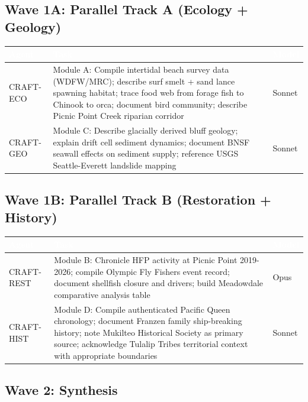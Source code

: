 \documentclass[11pt,letterpaper]{article}
\newcommand{\tableheader}[1]{\textbf{\sffamily\textcolor{white}{#1}}}
\begin{document}
\subsection{Wave 1A: Parallel Track A (Ecology + Geology)}

\begin{center}
\begin{tabularx}{\textwidth}{L{2cm}XL{2cm}}
\toprule
{}
\tableheader{Agent} & \tableheader{Task} & \tableheader{Model} \\
\midrule
CRAFT-ECO & Module A: Compile intertidal beach survey data (WDFW/MRC); describe surf smelt + sand lance spawning habitat; trace food web from forage fish to Chinook to orca; document bird community; describe Picnic Point Creek riparian corridor & Sonnet \\
CRAFT-GEO & Module C: Describe glacially derived bluff geology; explain drift cell sediment dynamics; document BNSF seawall effects on sediment supply; reference USGS Seattle-Everett landslide mapping & Sonnet \\
\bottomrule
\end{tabularx}
\end{center}

\subsection{Wave 1B: Parallel Track B (Restoration + History)}

\begin{center}
\begin{tabularx}{\textwidth}{L{2cm}XL{2cm}}
\toprule
{}
\tableheader{Agent} & \tableheader{Task} & \tableheader{Model} \\
\midrule
CRAFT-REST & Module B: Chronicle HFP activity at Picnic Point 2019-2026; compile Olympic Fly Fishers event record; document shellfish closure and drivers; build Meadowdale comparative analysis table & Opus \\
CRAFT-HIST & Module D: Compile authenticated Pacific Queen chronology; document Franzen family ship-breaking history; note Mukilteo Historical Society as primary source; acknowledge Tulalip Tribes territorial context with appropriate boundaries & Sonnet \\
\bottomrule
\end{tabularx}
\end{center}

\subsection{Wave 2: Synthesis}
\end{document}
